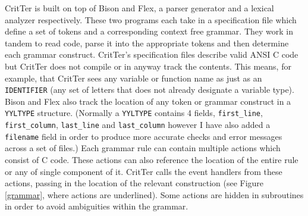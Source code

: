 \documentclass[12pt]{report}
\def\lstlistingname{Figure}
\newcommand{\refCode}{\lstlistingname \hspace{1mm}}
\newcommand{\programName}{CritTer\xspace}
\begin{document}
\programName is built on top of Bison and Flex, a parser generator and a lexical analyzer 
respectively. These two programs each take in a specification file which define a set of tokens and a 
corresponding context free grammar. They work in tandem to read code, parse it into the appropriate 
tokens and then determine each grammar construct. \programName's specification files 
describe valid ANSI C code but \programName does not compile or in anyway track the contents. This 
means, for example, that \programName sees any variable or function name as just as an 
\lstinline{IDENTIFIER} (any set of letters that does not already designate a 
variable type). Bison and Flex also track the location of any token or grammar construct in a 
\lstinline{YYLTYPE} structure. (Normally a \lstinline{YYLTYPE} contains 4 fields, \lstinline{first_line}, 
\lstinline{first_column}, \lstinline{last_line} and \lstinline{last_column} however I have also added a 
\lstinline{filename} field in order to produce more accurate checks and error messages across a set of 
files.) Each grammar rule can contain multiple actions which consist of C code. These actions can 
also reference the location of the entire rule or any of single component of it. \programName calls the 
event handlers from these actions, passing in the location of the relevant construction (see \refCode 
\ref{grammar}, where actions are underlined). Some actions are hidden in subroutines in order to 
avoid ambiguities within the grammar.
\end{document}
